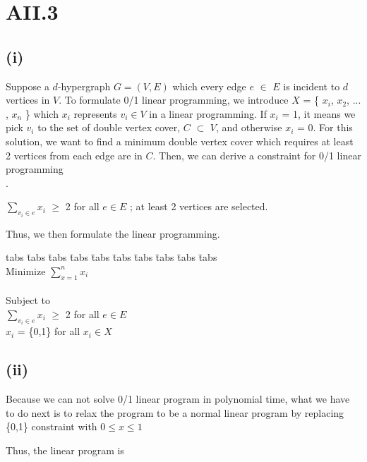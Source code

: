 \section* {AII.3}
\label {a2-3}
\subsection*{(i)}

Suppose a $d$-hypergraph $G = (V,E)$ which every edge $e$ $\in$ $E$ is incident to $d$ vertices in $V$. To formulate 0/1 linear programming, we introduce $X$ = \{ $x{_i}$, $x{_2}$, ... , $x{_n}$ \} which $x{_i}$ represents $v_i \in V$ in a linear programming.
If $x_i$ = 1, it means we pick $v_i$ to the set of double vertex cover, $C$ $\subset$ $V$, and otherwise $x_i$ = 0. For this solution, we want to find a minimum double vertex cover which requires at least 2 vertices from each edge are in $C$. Then, we can derive a constraint for 0/1 linear programming\\.

\begin{center}
$\sum\limits_{v_{i} \in e} x_i$ $\geq$ 2 for all $e \in E$ ; at least 2 vertices are selected.
\end{center}



Thus, we then formulate the linear programming.

\begin{tabbing}
	tabs \= tabs \= tabs \= tabs \= tabs \= tabs \= tabs \= tabs \= tabs \= tabs \kill \\ 
	\> \> Minimize \>\>\>\>\>$\sum\limits_{x=1}^n x_i$  \\ \\
	\> \> Subject to \\
	\> \> \> \> $\sum\limits_{v_{i} \in e} x_i$ $\geq$ 2 \> \> \> for all $e \in E$\\
	\> \> \> \> $x_i$ = \{0,1\} \> \> \> for all $x_i \in X$ \\
\end{tabbing}

\subsection*{(ii)}

Because we can not solve 0/1 linear program in polynomial time, what we have to do next is to relax the program to be a normal
linear program by replacing \{0,1\} constraint with
$0 \leq x \leq 1$

Thus, the linear program is

